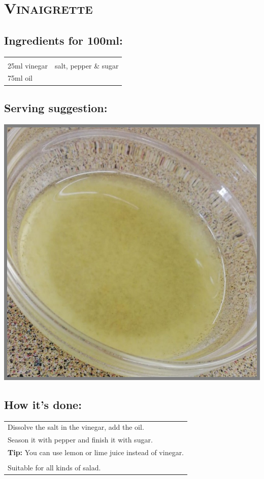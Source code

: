 \section{\textsc{Vinaigrette}}

\subsection*{Ingredients for 100ml:}

\begin{tabular}{p{7.5cm} p{7.5cm}}
	& \\
	25ml vinegar & salt, pepper \& sugar \\
	75ml oil & 
\end{tabular}

\subsection*{Serving suggestion:}

\includegraphics[width=\textwidth]{img/d_vinaigrette.jpeg} \cite{vinaigrette}

\subsection*{How it's done:}

\begin{tabular}{p{15cm}}
	\\
	Dissolve the salt in the vinegar, add the oil.\\
	Season it with pepper and finish it with sugar.\\
	\textbf{Tip:} You can use lemon or lime juice instead of vinegar.\\
	\\
	Suitable for all kinds of salad.
\end{tabular}
